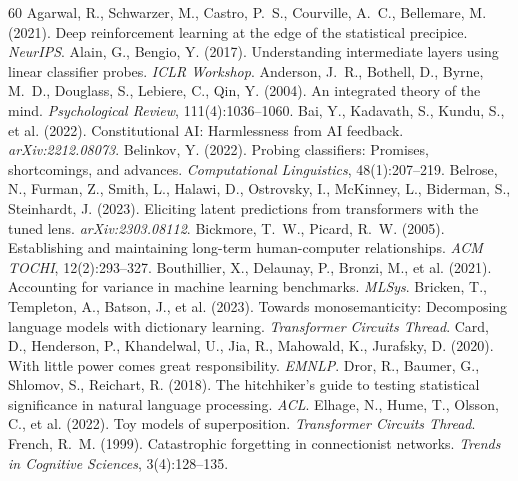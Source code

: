 \documentclass{article}
\begin{document}
\begin{thebibliography}{60}
 Agarwal, R., Schwarzer, M., Castro, P.~S., Courville, A.~C., Bellemare, M. (2021). Deep reinforcement learning at the edge of the statistical precipice. \emph{NeurIPS}.
 Alain, G., Bengio, Y. (2017). Understanding intermediate layers using linear classifier probes. \emph{ICLR Workshop}.
 Anderson, J.~R., Bothell, D., Byrne, M.~D., Douglass, S., Lebiere, C., Qin, Y. (2004). An integrated theory of the mind. \emph{Psychological Review}, 111(4):1036--1060.
 Bai, Y., Kadavath, S., Kundu, S., et al. (2022). Constitutional AI: Harmlessness from AI feedback. \emph{arXiv:2212.08073}.
 Belinkov, Y. (2022). Probing classifiers: Promises, shortcomings, and advances. \emph{Computational Linguistics}, 48(1):207--219.
 Belrose, N., Furman, Z., Smith, L., Halawi, D., Ostrovsky, I., McKinney, L., Biderman, S., Steinhardt, J. (2023). Eliciting latent predictions from transformers with the tuned lens. \emph{arXiv:2303.08112}.
 Bickmore, T.~W., Picard, R.~W. (2005). Establishing and maintaining long-term human-computer relationships. \emph{ACM TOCHI}, 12(2):293--327.
 Bouthillier, X., Delaunay, P., Bronzi, M., et al. (2021). Accounting for variance in machine learning benchmarks. \emph{MLSys}.
 Bricken, T., Templeton, A., Batson, J., et al. (2023). Towards monosemanticity: Decomposing language models with dictionary learning. \emph{Transformer Circuits Thread}.
 Card, D., Henderson, P., Khandelwal, U., Jia, R., Mahowald, K., Jurafsky, D. (2020). With little power comes great responsibility. \emph{EMNLP}.
 Dror, R., Baumer, G., Shlomov, S., Reichart, R. (2018). The hitchhiker's guide to testing statistical significance in natural language processing. \emph{ACL}.
 Elhage, N., Hume, T., Olsson, C., et al. (2022). Toy models of superposition. \emph{Transformer Circuits Thread}.
 French, R.~M. (1999). Catastrophic forgetting in connectionist networks. \emph{Trends in Cognitive Sciences}, 3(4):128--135.

\end{thebibliography}
\end{document}
